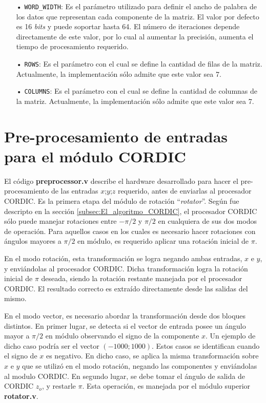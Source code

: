 \begin{itemize}
	\item[•] \verb;WORD_WIDTH;: Es el parámetro utilizado para definir el ancho de palabra de los datos que representan cada componente de la matriz. El valor por defecto es 16 \textit{bits} y puede soportar hasta 64. El número de iteraciones depende directamente de este valor, por lo cual al aumentar la precisión, aumenta el tiempo de procesamiento requerido.
	\item[•] \verb;ROWS;: Es el parámetro con el cual se define la cantidad de filas de la matriz. Actualmente, la implementación sólo admite que este valor sea 7.
	\item[•] \verb;COLUMNS;: Es el parámetro con el cual se define la cantidad de columnas de la matriz. Actualmente, la implementación sólo admite que este valor sea 7.
\end{itemize}

\section{Pre-procesamiento de entradas para el módulo CORDIC}

El código \textbf{preprocessor.v} describe el hardware desarrollado para hacer el pre-procesamiento de las entradas $x$;$y$;$z$ requerido, antes de enviarlas al procesador CORDIC. Es la primera etapa del módulo de rotación ``\textit{rotator}''. Según fue descripto en la sección \ref{subsec:El_algoritmo_CORDIC}, el procesador CORDIC sólo puede manejar rotaciones entre $-\pi/2$ y $\pi/2$ en cualquiera de sus dos modos de operación. Para aquellos casos en los cuales es necesario hacer rotaciones con ángulos mayores a $\pi/2$ en módulo, es requerido aplicar una rotación inicial de $\pi$.

En el modo rotación, esta transformación se logra negando ambas entradas, $x$ e $y$, y enviándolas al procesador CORDIC. Dicha transformación logra la rotación inicial de $\pi$ deseada, siendo la rotación restante manejada por el procesador CORDIC.  El resultado correcto es extraído directamente desde las salidas del mismo.

En el modo vector, es necesario abordar la transformación desde dos bloques distintos.
En primer lugar, se detecta si el vector de entrada posee un ángulo mayor a $\pi/2$ en módulo observando el signo de la componente $x$. Un ejemplo de dicho caso podría ser el vector $(-1000;1000)$. Estos casos se identifican cuando el signo de $x$ es negativo. En dicho caso, se aplica la misma transformación sobre $x$ e $y$ que se utilizó en el modo rotación, negando las componentes y enviándolas al modulo CORDIC.
En segundo lugar, se debe tomar el ángulo de salida de CORDIC $z_o$, y restarle $\pi$. Esta operación, es manejada por el módulo superior \textbf{rotator.v}.

